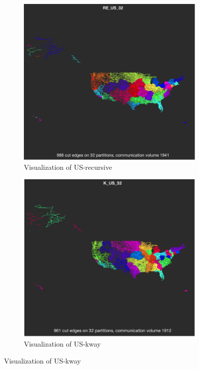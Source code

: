 \documentclass[unicode,11pt,a4paper,oneside,numbers=endperiod,openany]{scrartcl}
\begin{document}
\begin{figure}[htbp]
    \centering
    
    \begin{subfigure}[b]{0.4\textwidth}
        \includegraphics[width=\textwidth]{images/us-recu.png}
        \caption{Visualization of US-recursive}
    \end{subfigure}
    \hfill
    \begin{subfigure}[b]{0.4\textwidth}
        \includegraphics[width=\textwidth]{images/us-kway.png}
        \caption{Visualization of US-kway} 
    \end{subfigure}
    
\end{figure}
\end{document}
